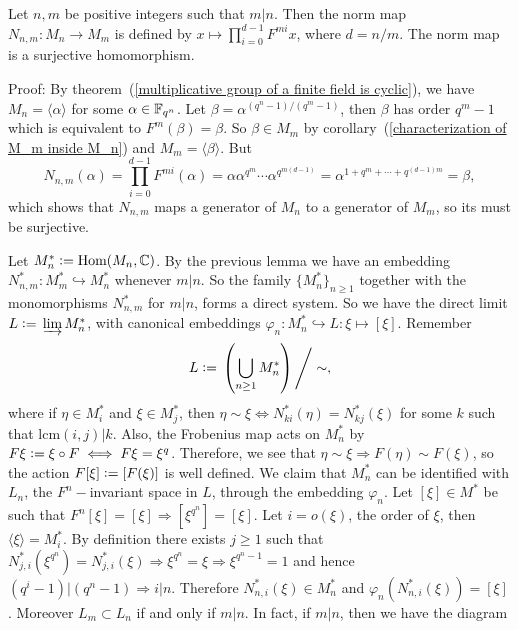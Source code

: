 \begin{dang}
\begin{lemma}\cite{macdonald1998symmetric}
  Let $n,m$ be positive integers such that $m|n$. Then the norm map $N_{n,m}: M_n\rightarrow M_m$ is defined by $x\mapsto \prod_{i=0}^{d-1}F^{mi}x$, where $d=n/m$. The norm map is a surjective homomorphism.
\end{lemma}
\end{dang}
Proof: By theorem~(\ref{multiplicative group of a finite field is cyclic}), we have $M_n=\langle \alpha\rangle$ for some $\alpha\in\mathbb{F}_{q^n}$. Let $\beta=\alpha^{(q^n-1)/(q^m-1)}$, then $\beta$ has order $q^m-1$ which is equivalent to $F^m(\beta)=\beta$. So $\beta\in M_m$ by corollary~(\ref{characterization of M_m inside M_n}) and $M_m=\langle \beta\rangle$. But
\begin{equation}
    N_{n,m}(\alpha)=\prod_{i=0}^{d-1}F^{mi}(\alpha)=\alpha\alpha^{q^m}\cdots \alpha^{q^{m(d-1)}}=\alpha^{1+q^m+\cdots+q^{(d-1)m}}=\beta,
\end{equation}
which shows that $N_{n,m}$ maps a generator of $M_n$ to a generator of $M_m$, so its must be surjective.\par
Let $M_n^*\bydef\text{Hom}(M_n,\bb{C})$. By the previous lemma we have an embedding $N_{n,m}^*:M_m^*\hookrightarrow M_n^*$ whenever $m|n$. So the family $\{M_n^*\}_{n\geq1}$ together with the monomorphisms $N_{n,m}^*$ for $m|n$, forms a direct system. So we have the direct limit $L\bydef \varinjlim M_n^*$, with canonical embeddings $\varphi_n: M_n^*\hookrightarrow L:\xi\mapsto[\xi]$. Remember
\begin{equation}
    L\bydef\left(\bigcup_{n\geq1}M_n^*\right)\Bigg/\sim ,
\end{equation}
where if $\eta\in M_i^*$ and $ \xi\in M_j^*$, then $\eta\sim\xi\iff N_{ki}^*(\eta)=N_{kj}^*(\xi)$ for some $k$ such that $\text{lcm}(i,j)|k$. Also, the Frobenius map acts on $M_n^*$ by $F\xi\bydef \xi\circ F\iff F\xi=\xi^q$. Therefore, we see that $\eta\sim\xi\Rightarrow F(\eta)\sim F(\xi)$, so the action $F[\xi]\bydef[F(\xi)]$ is well defined. We claim that $M_n^*$ can be identified with $L_n$, the $F^n-$invariant space in $L$, through the embedding $\varphi_n$. Let $[\xi]\in M^*$ be such that $F^n[\xi]=[\xi]\Rightarrow [\xi^{q^n}]=[\xi]$. Let $i=o(\xi)$, the order of 
$\xi$, then $\langle\xi\rangle=M_i^*$. By definition there exists $j\geq1$ such that $N_{j,i}^*(\xi^{q^n})=N_{j,i}^*(\xi)\Rightarrow\xi^{q^n}=\xi\Rightarrow\xi^{q^n-1}=1$ and hence $(q^{i}-1)|(q^n-1)\Rightarrow i|n$. Therefore $N_{n,i}^*(\xi)\in M_n^*$ and $\varphi_n(N_{n,i}^*(\xi))=[\xi]$. Moreover $L_m\subset L_n$ if and only if $m|n$. In fact, if $m|n$, then we have the diagram
